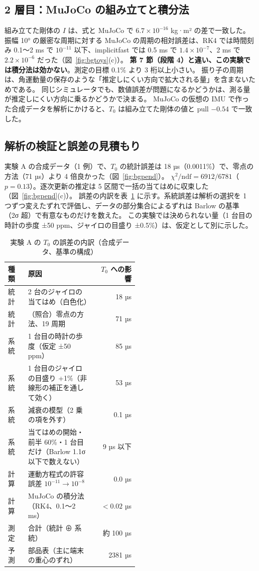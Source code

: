 \documentclass[paper=a4paper,fontsize=10pt,twocolumn,column_gap=2zw,line_length=24zw,number_of_lines=46,head_space=20mm]{jlreq}
\begin{document}
\subsection{2 層目：MuJoCo の組み立てと積分法}

組み立てた剛体の $I$ は、式と MuJoCo で $6.7\times10^{-16}$ kg·m² の差で一致した。
振幅 10° の厳密な周期に対する MuJoCo の周期の相対誤差は、RK4 では時間刻み 0.1〜2 ms で $10^{-11}$ 以下、implicitfast では 0.5 ms で $1.4\times10^{-7}$、2 ms で $2.2\times10^{-6}$ だった（図~\ref{fig:bgtoys}(c)）。
\textbf{第 7 節（段階 4）と違い、この実験では積分法は効かない}。測定の目標 0.1\% より 3 桁以上小さい。
振り子の周期は、角運動量の保存のような「推定しにくい方向で拡大される量」を含まないためである。
同じシミュレータでも、数値誤差が問題になるかどうかは、測る量が推定しにくい方向に乗るかどうかで決まる。
MuJoCo の仮想の IMU で作った合成データを解析にかけると、$T_0$ は組み立てた剛体の値と pull $-0.54$ で一致した。

\subsection{解析の検証と誤差の見積もり}

実験 A の合成データ（1 例）で、$T_0$ の統計誤差は 18 µs（0.0011\%）で、零点の方法（71 µs）より 4 倍良かった（図~\ref{fig:bgpend}）。
$\chi^2/\mathrm{ndf} = 6912/6781$（$p=0.13$）。逐次更新の推定は 5 区間で一括の当てはめに収束した（図~\ref{fig:bgpend}(c)）。
誤差の内訳を表~\ref{tab:bangai} に示す。系統誤差は解析の選択を 1 つずつ変えたずれで評価し、データの部分集合によるずれは Barlow の基準 \cite{barlow2002}（2σ 超）で有意なものだけを数えた。
この実験では決められない量（1 台目の時計の歩度 ±50 ppm、ジャイロの目盛り ±0.5\%）は、仮定として別に示した。

\begin{table}[t]\centering\footnotesize
\caption{実験 A の $T_0$ の誤差の内訳（合成データ、基準の構成）}\label{tab:bangai}
\setlength{\tabcolsep}{2.5pt}
\begin{tabular}{lp{0.52\linewidth}r}\toprule
種類 & 原因 & $T_0$ への影響 \\\midrule
統計 & 2 台のジャイロの当てはめ（白色化） & 18 µs \\
統計 & （照合）零点の方法、19 周期 & 71 µs \\
系統 & 1 台目の時計の歩度（仮定 ±50 ppm） & 85 µs \\
系統 & 1 台目のジャイロの目盛り +1\%（非線形の補正を通して効く） & 53 µs \\
系統 & 減衰の模型（2 乗の項を外す） & 0.1 µs \\
系統 & 当てはめの開始・前半 60\%・1 台目だけ（Barlow 1.1σ 以下で数えない） & 9 µs 以下 \\
計算 & 運動方程式の許容誤差 $10^{-11}\to10^{-8}$ & 0.0 µs \\
計算 & MuJoCo の積分法（RK4、0.1〜2 ms） & $<0.02$ µs \\\midrule
測定 & 合計（統計 ⊕ 系統） & 約 100 µs \\
予測 & 部品表（主に端末の重心のずれ） & 2381 µs \\\bottomrule
\end{tabular}
\end{table}
\end{document}
